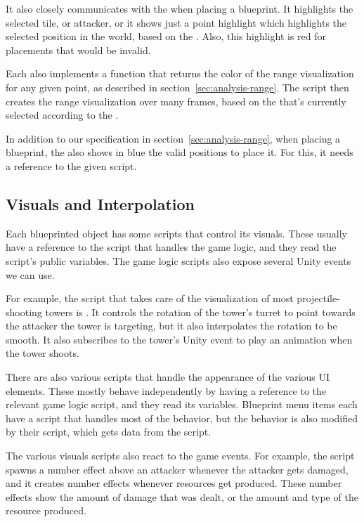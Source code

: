 It also closely communicates with the  when placing a blueprint.
It highlights the selected tile, or attacker, or it shows just a point highlight which highlights the selected position in the world, based on the .
Also, this highlight is red for placements that would be invalid.

Each  also implements a function that returns the color of the range visualization for any given point, as described in section~\ref{sec:analysis-range}.
The script  then creates the range visualization over many frames, based on the  that's currently selected according to the .

In addition to our specification in section~\ref{sec:analysis-range}, when placing a blueprint, the  also shows in blue the valid positions to place it.
For this, it needs a reference to the given  script.

\subsection{Visuals and Interpolation}

Each blueprinted object has some scripts that control its visuals.
These usually have a reference to the script that handles the game logic, and they read the script's public variables.
The game logic scripts also expose several Unity events we can use.

For example, the script that takes care of the visualization of most projectile-shooting towers is .
It controls the rotation of the tower's turret to point towards the attacker the tower is targeting, but it also interpolates the rotation to be smooth.
It also subscribes to the tower's  Unity event to play an animation when the tower shoots.

There are also various scripts that handle the appearance of the various UI elements.
These mostly behave independently by having a reference to the relevant game logic script, and they read its variables.
Blueprint menu items each have a  script that handles most of the behavior, but the behavior is also modified by their  script, which gets data from the  script.

The various visuals scripts also react to the game events.
For example, the  script spawns a number effect above an attacker whenever the attacker gets damaged, and it creates number effects whenever resources get produced.
These number effects show the amount of damage that was dealt, or the amount and type of the resource produced.

